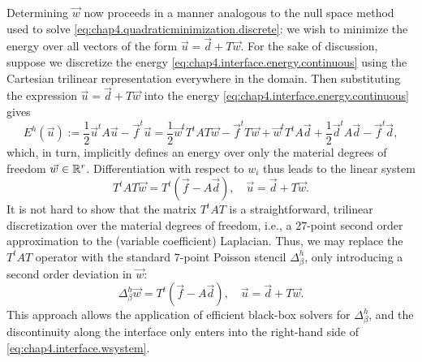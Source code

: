 Determining $\vec{w}$ now proceeds in a manner analogous to the null space method used to solve \eqref{eq:chap4.quadraticminimization.discrete}: we wish to minimize the energy over all vectors of the form $\vec{u} = \vec{d} + T \vec{w}$. For the sake of discussion, suppose we discretize the energy \eqref{eq:chap4.interface.energy.continuous} using the Cartesian trilinear representation everywhere in the domain. Then substituting the expression $\vec{u} = \vec{d} + T \vec{w}$ into the energy \eqref{eq:chap4.interface.energy.continuous} gives
\begin{equation*}
E^h(\vec{u}) := \frac{1}{2} \vec{u}^t A \vec{u} - \vec{f}^t \vec{u} = \frac{1}{2} \vec{w}^t T^tAT \vec{w} - \vec{f}^t T \vec{w} + \vec{w}^t T^tA \vec{d} + \frac{1}{2} \vec{d}^t A \vec{d} - \vec{f}^t \vec{d},
\end{equation*}
which, in turn, implicitly defines an energy over only the material degrees of freedom $\vec{w} \in \mathbb{R}^r$. Differentiation with respect to $w_i$ thus leads to the linear system
\begin{equation*}
T^tAT \vec{w} = T^t (\vec{f} - A \vec{d}), \quad \vec{u} = \vec{d} + T \vec{w}.
\end{equation*}
It is not hard to show that the matrix $T^tAT$ is a straightforward, trilinear discretization over the material degrees of freedom, i.e., a $27$-point second order approximation to the (variable coefficient) Laplacian. Thus, we may replace the $T^tAT$ operator with the standard $7$-point Poisson stencil $\Delta_{\beta}^h$, only introducing a second order deviation in $\vec{w}$:
\begin{equation} \label{eq:chap4.interface.wsystem}
\Delta_{\beta}^h \vec{w} = T^t (\vec{f} - A \vec{d}), \quad \vec{u} = \vec{d} + T \vec{w}.
\end{equation}
This approach allows the application of efficient black-box solvers for $\Delta_{\beta}^h$, and the discontinuity along the interface only enters into the right-hand side of \eqref{eq:chap4.interface.wsystem}.

